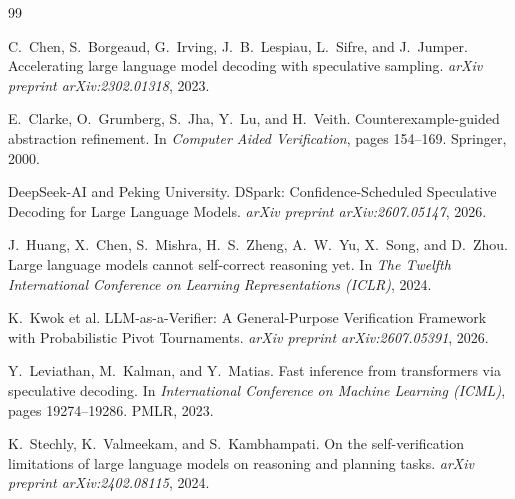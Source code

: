 \documentclass[10pt,twocolumn,letterpaper]{article}
\begin{document}
\begin{thebibliography}{99}

C.~Chen, S.~Borgeaud, G.~Irving, J.~B.~Lespiau, L.~Sifre, and J.~Jumper.
\newblock Accelerating large language model decoding with speculative sampling.
\newblock \emph{arXiv preprint arXiv:2302.01318}, 2023.

E.~Clarke, O.~Grumberg, S.~Jha, Y.~Lu, and H.~Veith.
\newblock Counterexample-guided abstraction refinement.
\newblock In \emph{Computer Aided Verification}, pages 154--169. Springer, 2000.

DeepSeek-AI and Peking University.
\newblock DSpark: Confidence-Scheduled Speculative Decoding for Large Language Models.
\newblock \emph{arXiv preprint arXiv:2607.05147}, 2026.

J.~Huang, X.~Chen, S.~Mishra, H.~S.~Zheng, A.~W.~Yu, X.~Song, and D.~Zhou.
\newblock Large language models cannot self-correct reasoning yet.
\newblock In \emph{The Twelfth International Conference on Learning Representations (ICLR)}, 2024.

K.~Kwok et al.
\newblock LLM-as-a-Verifier: A General-Purpose Verification Framework with Probabilistic Pivot Tournaments.
\newblock \emph{arXiv preprint arXiv:2607.05391}, 2026.

Y.~Leviathan, M.~Kalman, and Y.~Matias.
\newblock Fast inference from transformers via speculative decoding.
\newblock In \emph{International Conference on Machine Learning (ICML)}, pages 19274--19286. PMLR, 2023.

K.~Stechly, K.~Valmeekam, and S.~Kambhampati.
\newblock On the self-verification limitations of large language models on reasoning and planning tasks.
\newblock \emph{arXiv preprint arXiv:2402.08115}, 2024.

\end{thebibliography}
\end{document}
